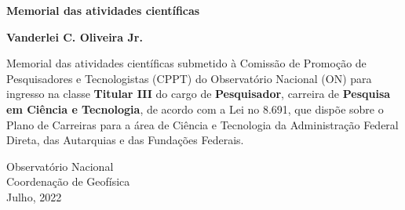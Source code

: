 \documentclass[11pt,a4paper,onecolumn,openany]{book}
\begin{document}
	
\begin{titlepage}
	\begin{center}
		\vspace*{3cm}

		\LARGE
		\textbf{Memorial das atividades científicas}

		\vspace{2.5cm}
		\large
		\textbf{Vanderlei C. Oliveira Jr.}

		\hspace{.45\textwidth}
		\begin{minipage}{.5\textwidth}
			\vspace{3.0cm}
			\normalsize
			Memorial das atividades científicas submetido à Comissão de Promoção de
			Pesquisadores e Tecnologistas (CPPT) do Observatório Nacional (ON) para
			ingresso na classe \textbf{Titular III} do cargo de \textbf{Pesquisador},  
			carreira de \textbf{Pesquisa em Ciência e Tecnologia}, de acordo com 
			a Lei no 8.691, que dispõe sobre o Plano de Carreiras para a área de 
			Ciência e Tecnologia da Administração Federal Direta, das Autarquias e 
			das Fundações Federais.
		\end{minipage}%
		\vspace*{\fill}

		\vspace{0.8cm}
			
		\small
		Observatório Nacional\\
		Coordenação de Geofísica \\
		Julho, 2022

	\end{center}
\end{titlepage}


\fancyhf{}
\tableofcontents
\fancyhf{}

\pagestyle{fancy}
\fancyhf{}
\rhead{}
\rfoot{\thepage}








{}
\end{document}
